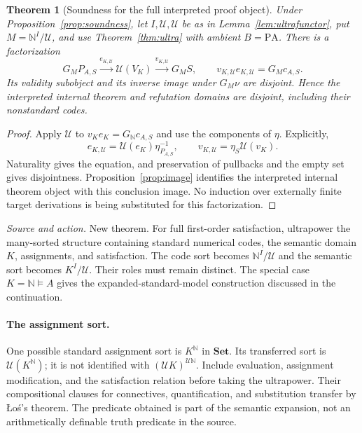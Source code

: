 \documentclass[11pt]{article}
\newtheorem{theorem}{Theorem}[section]
\theoremstyle{definition}\newtheorem{definition}[theorem]{Definition}
\newcommand{\PA}{\mathrm{PA}}
\newcommand{\N}{\mathbb N}
\newcommand{\Set}{\mathbf{Set}}
\newcommand{\U}{\mathcal U}
\newcommand{\source}[1]{\par\smallskip\noindent\textit{Source and action.} #1\par\smallskip}
\begin{document}
\begin{theorem}[Soundness for the full interpreted proof object]\label{thm:ultrasound}
Under Proposition~\ref{prop:soundness}, let $I,\U,\mathscr U$
be as in Lemma~\ref{lem:ultrafunctor}, put $M=\N^I/\U$,
and use Theorem~\ref{thm:ultra} with ambient $B=\PA$.
There is a factorization
\[
 G_MP_{A,S}\xrightarrow{e_{K,\U}}\mathscr U(V_K)
 \xrightarrow{v_{K,\U}}G_MS,
 \qquad v_{K,\U}e_{K,\U}=G_Mc_{A,S}.
\]
Its validity subobject and its inverse image under $G_M\nu$ are
disjoint. Hence the interpreted internal theorem and refutation
domains are disjoint, including their nonstandard codes.
\end{theorem}
\begin{proof}
Apply $\mathscr U$ to $v_Ke_K=G_{\N}c_{A,S}$ and use the
components of $\eta$. Explicitly,
\[
 e_{K,\U}=\mathscr U(e_K)\eta_{P_{A,S}}^{-1},\qquad
 v_{K,\U}=\eta_S\mathscr U(v_K).
\]
Naturality gives the equation, and preservation of pullbacks and
the empty set gives disjointness. Proposition~\ref{prop:image}
identifies the interpreted internal theorem object with this
conclusion image. No induction over externally finite target
derivations is being substituted for this factorization.
\end{proof}
\source{New theorem. For full first-order satisfaction, ultrapower the many-sorted structure containing standard numerical codes, the semantic domain $K$, assignments, and satisfaction. The code sort becomes $\N^I/\U$ and the semantic sort becomes $K^I/\U$. Their roles must remain distinct. The special case $K=\N\models A$ gives the expanded-standard-model construction discussed in the continuation.}

\paragraph{The assignment sort.}
One possible standard assignment sort is $K^{\N}$ in $\Set$.
Its transferred sort is $\mathscr U(K^{\N})$; it is not identified
with $(\mathscr U K)^{\mathscr U\N}$. Include evaluation, assignment
modification, and the satisfaction relation before taking the
ultrapower. Their compositional clauses for connectives,
quantification, and substitution transfer by \L{}o\'s's theorem.
The predicate obtained is part of the semantic expansion, not an
arithmetically definable truth predicate in the source.
\end{document}
